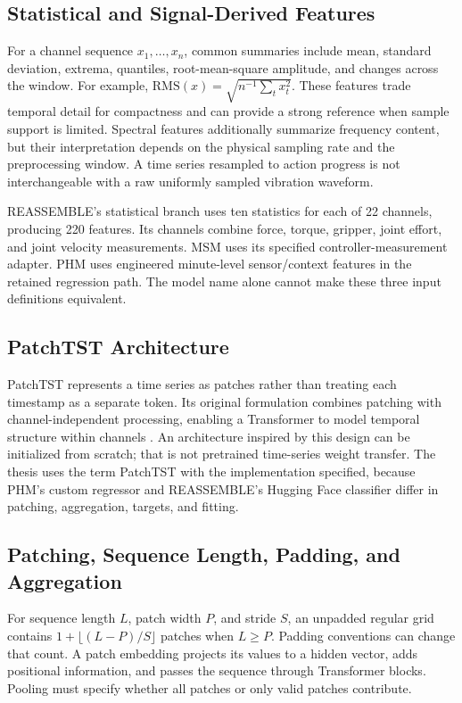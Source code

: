 \subsection{Statistical and Signal-Derived Features}
For a channel sequence $x_1,\ldots,x_n$, common summaries include mean, standard deviation, extrema, quantiles, root-mean-square amplitude, and changes across the window. For example, $\mathrm{RMS}(x)=\sqrt{n^{-1}\sum_t x_t^2}$. These features trade temporal detail for compactness and can provide a strong reference when sample support is limited. Spectral features additionally summarize frequency content, but their interpretation depends on the physical sampling rate and the preprocessing window. A time series resampled to action progress is not interchangeable with a raw uniformly sampled vibration waveform.

REASSEMBLE's statistical branch uses ten statistics for each of 22 channels, producing 220 features. Its channels combine force, torque, gripper, joint effort, and joint velocity measurements. MSM uses its specified controller-measurement adapter. PHM uses engineered minute-level sensor/context features in the retained regression path. The model name alone cannot make these three input definitions equivalent.

\subsection{PatchTST Architecture}
PatchTST represents a time series as patches rather than treating each timestamp as a separate token. Its original formulation combines patching with channel-independent processing, enabling a Transformer to model temporal structure within channels \citep{Nie2023PatchTST}. An architecture inspired by this design can be initialized from scratch; that is not pretrained time-series weight transfer. The thesis uses the term PatchTST with the implementation specified, because PHM's custom regressor and REASSEMBLE's Hugging Face classifier differ in patching, aggregation, targets, and fitting.

\subsection{Patching, Sequence Length, Padding, and Aggregation}
For sequence length $L$, patch width $P$, and stride $S$, an unpadded regular grid contains $1+\lfloor(L-P)/S\rfloor$ patches when $L\geq P$. Padding conventions can change that count. A patch embedding projects its values to a hidden vector, adds positional information, and passes the sequence through Transformer blocks. Pooling must specify whether all patches or only valid patches contribute.

